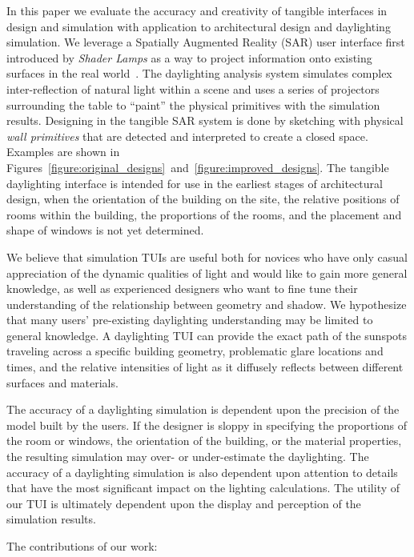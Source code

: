 \documentclass{article}
\begin{document}
In this paper we evaluate the accuracy and creativity of tangible
interfaces in design and simulation with application to architectural
design and daylighting simulation.  We leverage a Spatially Augmented
Reality (SAR) user interface first introduced by \emph{Shader Lamps}
as a way to project information onto existing surfaces in the real
world~\cite{Raskar:2001:SLA}.  The daylighting analysis system
simulates complex inter-reflection of natural light within a scene and
uses a series of projectors surrounding the table to ``paint'' the
physical primitives with the simulation results.  
%
Designing in the tangible SAR system is done by sketching with
physical \emph{wall primitives} that are detected and interpreted to
create a closed space.  Examples are shown in
Figures~\ref{figure:original_designs}~and~\ref{figure:improved_designs}.
The tangible daylighting interface is intended for use in the earliest
stages of architectural design, when the orientation of the building
on the site, the relative positions of rooms within the building, the
proportions of the rooms, and the placement and shape of windows is
not yet determined.


We believe that simulation TUIs are useful both for novices who have
only casual appreciation of the dynamic qualities of light and would
like to gain more general knowledge, as well as experienced designers
who want to fine tune their understanding of the relationship between
geometry and shadow.  We hypothesize that many users' pre-existing
daylighting understanding may be limited to general knowledge.  A
daylighting TUI can provide the exact path of the sunspots traveling
across a specific building geometry, problematic glare locations and
times, and the relative intensities of light as it diffusely reflects
between different surfaces and materials.

The accuracy of a daylighting simulation is dependent upon the
precision of the model built by the users.  If the designer is sloppy
in specifying the proportions of the room or windows, the orientation
of the building, or the material properties, the resulting simulation
may over- or under-estimate the daylighting.  The accuracy of a
daylighting simulation is also dependent upon attention to details
that have the most significant impact on the lighting calculations.
The utility of our TUI is ultimately dependent upon the display and
perception of the simulation results.


\noindent
The contributions of our work: \vspace{-0.05in}
\end{document}
